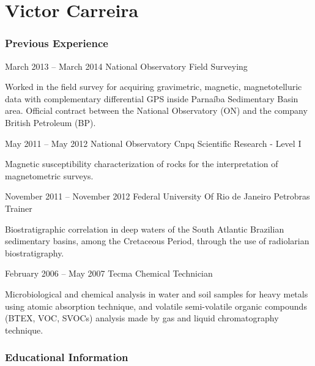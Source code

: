 \documentclass{tccv}
\begin{document}
\part{Victor Carreira}

\section{Previous Experience}

\begin{eventlist}



\item{March 2013 -- March 2014}
     {National Observatory}
     {Field Surveying}


Worked in the field survey for acquiring gravimetric, magnetic, magnetotelluric data with complementary differential GPS inside Parnaíba Sedimentary Basin area. Official contract between the National Observatory (ON) and the company British Petroleum (BP).



\item{May 2011 -- May 2012}
     {National Observatory}
     {Cnpq Scientific Research - Level I}
    
Magnetic susceptibility characterization  of rocks for the interpretation of magnetometric surveys.



\item{November 2011 -- November 2012}
     {Federal University Of Rio de Janeiro}
     {Petrobras Trainer}

Biostratigraphic correlation in deep waters of the South Atlantic Brazilian sedimentary basins, among the Cretaceous Period, through the use of radiolarian biostratigraphy.



\item{February 2006 -- May 2007}
      {Tecma}
      {Chemical Technician}

Microbiological and chemical analysis in water and soil samples for heavy metals using atomic absorption technique, and volatile semi-volatile organic compounds (BTEX, VOC, SVOCs)  analysis made by gas and liquid chromatography technique.

\end{eventlist}

\section{Educational Information}
\end{document}
